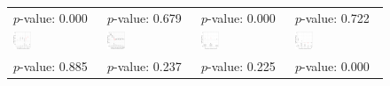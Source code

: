 \documentclass[12pt]{article}
\begin{document}
\begin{figure}[!ht]
\begin{minipage}{1\linewidth}
{\begin{tabular}{C{3.7cm}C{3.7cm}C{3.7cm}C{3.7cm}}
\citet{Clarke2020} \newline $p$-value: 0.000 & 
\citet{cox2021budgetary}\newline $p$-value: 0.679 & 
\citet{Distelhorst2018} \newline $p$-value: 0.000 &
\citet{Fouirnaies2018ajps} \newline $p$-value:  0.722 \\
  \hspace{-2em} \includegraphics[width = 0.22\textwidth]{figure/carryover/Clark_carryover.png} & 
  \hspace{-2em}  \includegraphics[width = 0.22\textwidth]{figure/carryover/Cox_carryover.png} &
\hspace{-2em}  \includegraphics[width = 0.22\textwidth]{figure/carryover/Distelhorst_carryover.png} &
\hspace{-2em} \includegraphics[width = 0.22\textwidth]{figure/carryover/Fouirnaies_carryover.png}\\ 
  \citet{fh2018} \newline $p$-value: 0.885  &
  \citet{Fouirnaies2022}\newline $p$-value: 0.237 &
  \citet{Grumbach2020}\newline $p$-value: 0.225 &
    \citet{Grumbach2022}\newline $p$-value: 0.000\\ 

\end{tabular}}
\end{minipage}
\end{figure}
\end{document}
